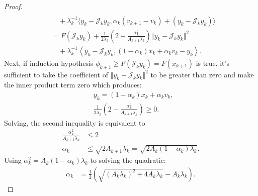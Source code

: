 \documentclass[12pt]{article}
\begin{document}
\begin{proof}
\begin{align*}
                \\
                    &\quad 
                    + 
                    \lambda_k^{-1}
                    \langle
                        y_k - \mathcal J_k y_k,
                        \alpha_k(v_{k + 1} - v_k) + (y_k - \mathcal J_k y_k)
                    \rangle
                \\
                &= 
                F(\mathcal J_k y_k)
                + 
                \frac{1}{2\lambda_k}
                \left(
                    2 - \frac{\alpha_k^2}{A_{k + 1}\lambda_k}
                \right)
                \Vert y_k - \mathcal J_ky_k\Vert^2
                \\
                    & \quad 
                    + 
                    \lambda_k^{-1}
                    \left\langle 
                        y_k - \mathcal J_k y_k, 
                        (1 - \alpha_k)x_k + \alpha_k v_k - y_k
                    \right\rangle. 
            \end{align*}
            Next, if induction hypothesis $\phi_{k + 1}\ge F(\mathcal J_k y_k) = F(x_{k + 1})$ is true, it's sufficient to take the coefficient of $\Vert y_k - \mathcal J_k y_k\Vert^2$ to be greater than zero and make the inner product term zero which produces: 
            \begin{align*}
                & 
                y_k = (1 - \alpha_k)x_k + \alpha_k v_k, 
                \\
                &
                \frac{1}{2\lambda_k}
                \left(
                    2 - \frac{\alpha_k^2}{A_{k + 1}\lambda_k}
                \right) 
                \ge 0.
            \end{align*}
            Solving, the second inequality is equivalent to
            \begin{align*}
                \frac{\alpha_k^2}{A_{k + 1}\lambda_k} 
                & 
                \le 2
                \\
                \alpha_k
                & 
                \le
                \sqrt{2A_{k + 1}\lambda_k}
                = \sqrt{2A_k(1 - \alpha_k)\lambda_k}. 
            \end{align*}
            Using $\alpha_k^2 = A_k(1 - \alpha_k)\lambda_k$ to solving the quadratic: 
            \begin{align*}
                \alpha_k
                &= 
                \frac{1}{2}\left(
                    \sqrt{(A_k\lambda_k)^2 + 4A_k \lambda_k}
                    - A_k\lambda_k
                \right). 
            \end{align*}
        \end{proof}
\end{document}
